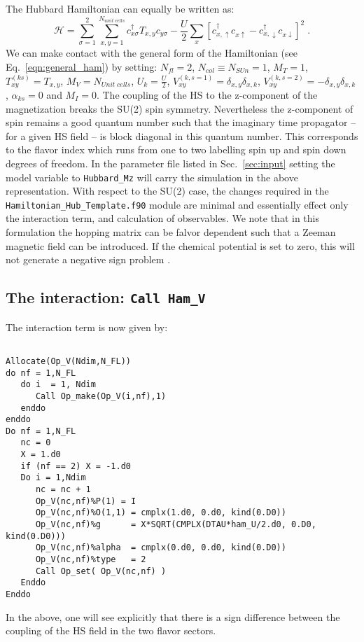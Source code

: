 The Hubbard Hamiltonian can equally be written as:
\begin{equation}
\label{eqn_hubbard_Mz}
\mathcal{H}=
\sum\limits_{\sigma=1}^{2} 
\sum\limits_{x,y =1 }^{N_{unit\; cells }} 
  c^{\dagger}_{x \sigma} T_{x,y}c^{\phantom\dagger}_{y \sigma} 
- \frac{U}{2}\sum\limits_{x}\left[
c^{\dagger}_{x, \uparrow} c^{\phantom\dagger}_{x \uparrow}  -   c^{\dagger}_{x, \downarrow} c^{\phantom\dagger}_{x \downarrow}  \right]^{2}\;.
\end{equation} 
We can make contact with the general form of the Hamiltonian  (see Eq.~\ref{eqn:general_ham}) by setting: 
$N_{fl} = 2$, $N_{col} \equiv N_{SUn}     =1 $,   $M_T    =    1$,  $T^{(ks)}_{x y}   =  T_{x,y}$,  $M_V   =  N_{Unit\; cells} $,  $U_{k}       =   \frac{U}{2}$, 
 $V_{x y}^{(k, s=1)} =  \delta_{x,y} \delta_{x,k}  $,  $V_{x y}^{(k, s=2)} =  - \delta_{x,y} \delta_{x,k}  $,  $\alpha_{ks}   = 0  $ and $M_I       = 0 $.   The coupling of the HS  to the z-component of   the magnetization breaks the SU(2) spin symmetry. Nevertheless the z-component of spin remains a good quantum number such that  the imaginary time propagator -- for a given HS field -- is block  diagonal in this quantum number. This corresponds to the flavor index  which runs from one to two  labelling spin up and spin down  degrees of freedom.       In the parameter file  listed in  Sec.~\ref{sec:input}  setting the model variable to  \texttt{Hubbard\_Mz}  will carry the simulation in the above representation.   With respect to the SU(2) case, the changes required in the \texttt{Hamiltonian\_Hub\_Template.f90}   module are  minimal and essentially effect only the interaction term, and calculation of observables.  We note that  in this formulation the  hopping matrix can be falvor dependent such that a Zeeman  magnetic field can be introduced.  If the chemical potential is set to zero, this will not generate a negative sign problem \cite{??}.    
 \subsection{The interaction: \texttt{Call Ham\_V} } 
The interaction term is now given by: 

\begin{lstlisting}

Allocate(Op_V(Ndim,N_FL))
do nf = 1,N_FL
   do i  = 1, Ndim
      Call Op_make(Op_V(i,nf),1)
   enddo
enddo
Do nf = 1,N_FL
   nc = 0
   X = 1.d0
   if (nf == 2) X = -1.d0
   Do i = 1,Ndim
      nc = nc + 1
      Op_V(nc,nf)%P(1) = I
      Op_V(nc,nf)%O(1,1) = cmplx(1.d0, 0.d0, kind(0.D0))
      Op_V(nc,nf)%g      = X*SQRT(CMPLX(DTAU*ham_U/2.d0, 0.D0, kind(0.D0))) 
      Op_V(nc,nf)%alpha  = cmplx(0.d0, 0.d0, kind(0.D0))
      Op_V(nc,nf)%type   = 2
      Call Op_set( Op_V(nc,nf) )
   Enddo
Enddo

\end{lstlisting}
In the above, one will see explicitly that  there is a sign   difference between  the coupling of the HS field  in  the  two flavor sectors.  


